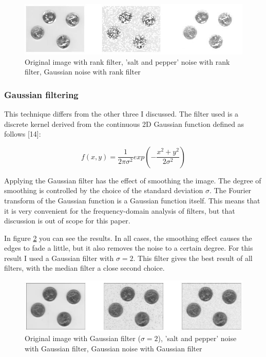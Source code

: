 \documentclass[12pt]{article}
\begin{document}
\begin{figure}[h]
\hspace*{-1.2cm}
\centering
\includegraphics[scale = 0.8]{img/noise_rank}
\caption{Original image with rank filter, 'salt and pepper' noise with rank filter, Gaussian noise with rank filter}
\label{noise_rank}
\end{figure}
\newpage

\subsubsection{Gaussian filtering}

This technique differs from the other three I discussed. The filter used is a discrete kernel derived from the continuous 2D Gaussian function defined as follows [14]:

\begin{equation}
f(x,y) = \frac{1}{2\pi \sigma ^2} exp(-\frac{x^2 + y^2}{2\sigma^2})
\end{equation}
\newline

Applying the Gaussian filter has the effect of smoothing the image. The degree of smoothing is controlled by the choice of the standard deviation $\sigma$. The Fourier transform of the Gaussian function is a Gaussian function itself. This means that it is very convenient for the frequency-domain analysis of filters, but that discussion is out of scope for this paper.
\newline

In figure \ref{noise_gaussian} you can see the results. In all cases, the smoothing effect causes the edges to fade a little, but it also removes the noise to a certain degree. For this result I used a Gaussian filter with $\sigma = 2$. This filter gives the best result of all filters, with the median filter a close second choice.

\begin{figure}[h]
\hspace*{-1.2cm}
\centering
\includegraphics[scale = 0.6]{img/noise_gaussian}
\caption{Original image with Gaussian filter ($\sigma = 2$), 'salt and pepper' noise with Gaussian filter, Gaussian noise with Gaussian filter}
\label{noise_gaussian}
\end{figure}
\newpage
\end{document}

